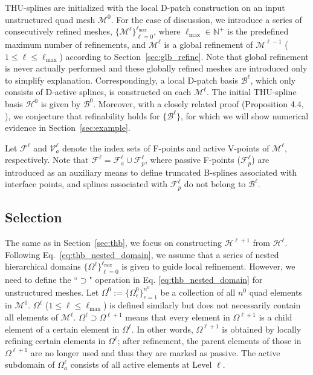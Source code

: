 \documentclass[graybox]{svmult}
\begin{document}
THU-splines are initialized with the local D-patch construction on an input unstructured quad mesh $\mathcal{M}^0$. For the ease of discussion, we introduce a series of consecutively refined meshes, $\{\mathcal{M}^{\ell}\}_{\ell=0}^{\ell_{\max}}$, where $\ell_{\max} \in\mathbb{N}^+$ is the predefined maximum number of refinements, and $\mathcal{M}^{\ell}$ is a global refinement of $\mathcal{M}^{\ell-1}$ ($1\leq\ell\leq \ell_{\max}$) according to Section~\ref{sec:glb_refine}. Note that global refinement is never actually performed and these globally refined meshes are introduced only to simplify explanation. Correspondingly, a local D-patch basis $\mathcal{B}^{\ell}$, which only consists of D-active splines, is constructed on each $\mathcal{M}^{\ell}$. The initial THU-spline basis $\mathcal{H}^0$ is given by $\mathcal{B}^0$. Moreover, with a closely related proof (Proposition 4.4, \cite{ref:toshniwal17}), we conjecture that refinability holds for $\{\mathcal{B}^\ell\}$, for which we will show numerical evidence in Section~\ref{sec:example}.

Let $\mathcal{F}^{\ell}$ and $\mathcal{V}_a^{\ell}$ denote the index sets of F-points and active V-points of $\mathcal{M}^{\ell}$, respectively. Note that $\mathcal{F}^{\ell}=\mathcal{F}_{a}^\ell \cup \mathcal{F}_{p}^\ell$, where passive F-points ($\mathcal{F}_{p}^\ell$) are introduced as an auxiliary means to define truncated B-splines associated with interface points, and splines associated with $\mathcal{F}_{p}^\ell$ do not belong to $\mathcal{B}^{\ell}$.

\subsection{Selection}

The same as in Section~\ref{sec:thb}, we focus on constructing $\mathcal{H}^{\ell+1}$ from $\mathcal{H}^{\ell}$. Following Eq.~\eqref{eq:thb_nested_domain}, we assume that a series of nested hierarchical domains $\{\Omega^\ell\}_{\ell=0}^{\ell_{\max}}$ is given to guide local refinement. However, we need to define the ``$\supset$" operation in Eq. \eqref{eq:thb_nested_domain} for unstructured meshes. Let $\Omega^0:=\{\Omega_e^0\}_{e=1}^{n^0}$ be a collection of all $n^0$ quad elements in $\mathcal{M}^0$. $\Omega^\ell$ ($1\leq\ell\leq\ell_{\max}$) is defined similarly but does not necessarily contain all elements of $\mathcal{M}^\ell$. $\Omega^{\ell} \supset \Omega^{\ell+1}$ means that every element in $\Omega^{\ell+1}$ is a child element of a certain element in $\Omega^\ell$. In other words, $\Omega^{\ell+1}$ is obtained by locally refining certain elements in $\Omega^{\ell}$; after refinement, the parent elements of those in $\Omega^{\ell+1}$ are no longer used and thus they are marked as passive.  The active subdomain of $\Omega_a^{\ell}$ consists of all active elements at Level $\ell$.
\end{document}
